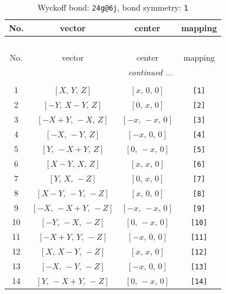 \documentclass[fleqn,8pt]{jsarticle}
\begin{document}
\begin{longtable}{cccc}
\caption{Wyckoff bond: {\tt 24g@6j}, bond symmetry: {\tt 1}}
 \\
 \hline \hline
No. & vector & center & mapping \\ \hline \endfirsthead

\multicolumn{3}{l}{\tablename\ \thetable{}} \\
 \hline \hline
No. & vector & center & mapping \\ \hline \endhead

 \hline \hline
\multicolumn{3}{r}{\footnotesize\it continued ...} \\ \endfoot

 \hline \hline
\multicolumn{3}{r}{} \\ \endlastfoot

1 & $\left[ X,\, Y,\, Z \right]$ & $\left[ x,\, 0,\, 0 \right]$ & {\tt [1]} \\ \hline
2 & $\left[ - Y,\, X - Y,\, Z \right]$ & $\left[ 0,\, x,\, 0 \right]$ & {\tt [2]} \\ \hline
3 & $\left[ - X + Y,\, - X,\, Z \right]$ & $\left[ - x,\, - x,\, 0 \right]$ & {\tt [3]} \\ \hline
4 & $\left[ - X,\, - Y,\, Z \right]$ & $\left[ - x,\, 0,\, 0 \right]$ & {\tt [4]} \\ \hline
5 & $\left[ Y,\, - X + Y,\, Z \right]$ & $\left[ 0,\, - x,\, 0 \right]$ & {\tt [5]} \\ \hline
6 & $\left[ X - Y,\, X,\, Z \right]$ & $\left[ x,\, x,\, 0 \right]$ & {\tt [6]} \\ \hline
7 & $\left[ Y,\, X,\, - Z \right]$ & $\left[ 0,\, x,\, 0 \right]$ & {\tt [7]} \\ \hline
8 & $\left[ X - Y,\, - Y,\, - Z \right]$ & $\left[ x,\, 0,\, 0 \right]$ & {\tt [8]} \\ \hline
9 & $\left[ - X,\, - X + Y,\, - Z \right]$ & $\left[ - x,\, - x,\, 0 \right]$ & {\tt [9]} \\ \hline
10 & $\left[ - Y,\, - X,\, - Z \right]$ & $\left[ 0,\, - x,\, 0 \right]$ & {\tt [10]} \\ \hline
11 & $\left[ - X + Y,\, Y,\, - Z \right]$ & $\left[ - x,\, 0,\, 0 \right]$ & {\tt [11]} \\ \hline
12 & $\left[ X,\, X - Y,\, - Z \right]$ & $\left[ x,\, x,\, 0 \right]$ & {\tt [12]} \\ \hline
13 & $\left[ - X,\, - Y,\, - Z \right]$ & $\left[ - x,\, 0,\, 0 \right]$ & {\tt [13]} \\ \hline
14 & $\left[ Y,\, - X + Y,\, - Z \right]$ & $\left[ 0,\, - x,\, 0 \right]$ & {\tt [14]} \\ \hline

\end{longtable}
\end{document}
